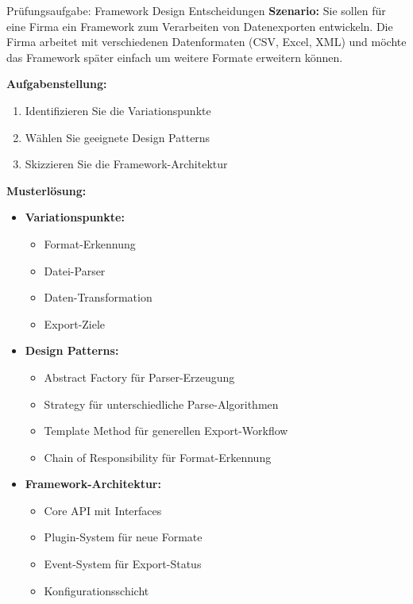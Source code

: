 \begin{example2}{Prüfungsaufgabe: Framework Design Entscheidungen}
\textbf{Szenario:}
Sie sollen für eine Firma ein Framework zum Verarbeiten von Datenexporten entwickeln.
Die Firma arbeitet mit verschiedenen Datenformaten (CSV, Excel, XML) und möchte das 
Framework später einfach um weitere Formate erweitern können.

\textbf{Aufgabenstellung:}
\begin{enumerate}
    \item Identifizieren Sie die Variationspunkte
    \item Wählen Sie geeignete Design Patterns
    \item Skizzieren Sie die Framework-Architektur
\end{enumerate}

\textbf{Musterlösung:}
\begin{itemize}
    \item \textbf{Variationspunkte:}
    \begin{itemize}
        \item Format-Erkennung
        \item Datei-Parser
        \item Daten-Transformation
        \item Export-Ziele
    \end{itemize}
    
    \item \textbf{Design Patterns:}
    \begin{itemize}
        \item Abstract Factory für Parser-Erzeugung
        \item Strategy für unterschiedliche Parse-Algorithmen
        \item Template Method für generellen Export-Workflow
        \item Chain of Responsibility für Format-Erkennung
    \end{itemize}
    
    \item \textbf{Framework-Architektur:}
    \begin{itemize}
        \item Core API mit Interfaces
        \item Plugin-System für neue Formate
        \item Event-System für Export-Status
        \item Konfigurationsschicht
    \end{itemize}
\end{itemize}
\end{example2}


